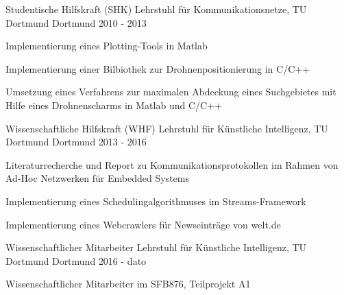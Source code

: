 

\begin{cventries}

  \cventry
    {Studentische Hilfskraft (SHK)} %
    {Lehrstuhl für Kommunikationsnetze, TU Dortmund} %
    {Dortmund} %
    {2010 - 2013} %
    {
      \begin{cvitems} %
        \item {Implementierung eines Plotting-Tools in Matlab}
        \item {Implementierung einer Bilbiothek zur Drohnenpositionierung in C/C++}
        \item {Umsetzung eines Verfahrens zur maximalen Abdeckung eines Suchgebietes mit Hilfe eines Drohnenscharms in Matlab und C/C++}
      \end{cvitems}
    }

    \cventry
    {Wissenschaftliche Hilfskraft (WHF)} %
    {Lehrstuhl für Künstliche Intelligenz, TU Dortmund} %
    {Dortmund} %
    {2013 - 2016} %
    {
      \begin{cvitems} %
        \item {Literaturrecherche und Report zu Kommunikationsprotokollen im Rahmen von Ad-Hoc Netzwerken für Embedded Systems}
        \item {Implementierung eines Schedulingalgorithmuses im Streams-Framework}
        \item {Implementierung eines Webcrawlers für Newseinträge von welt.de}
      \end{cvitems}
    }

  \cventry
    {Wissenschaftlicher Mitarbeiter} %
    {Lehrstuhl für Künstliche Intelligenz, TU Dortmund} %
    {Dortmund} %
    {2016 - dato} %
    {
      \begin{cvitems} %
        \item {Wissenschaftlicher Mitarbeiter im SFB876, Teilprojekt A1}
      \end{cvitems}
    }

\end{cventries}
